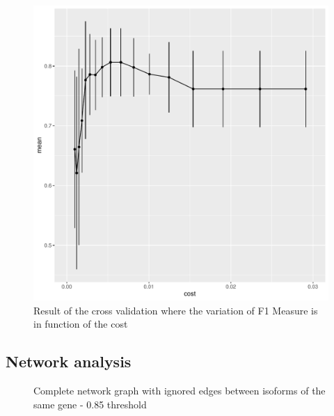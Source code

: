 \documentclass[journal]{IEEEtran}
\begin{document}
\begin{figure}[!ht]
    \centering
    \includegraphics[width=.8\linewidth]{images/svm_metrics.pdf}
    \caption{Result of the cross validation where the variation of F1 Measure is in function of the cost}\label{fig:svm}
\end{figure}


\clearpage
\newpage
\subsection{Network analysis}

\begin{figure}[!ht]
    \centering
    \caption{Complete network graph with ignored edges between isoforms of the same gene - 0.85 threshold}\label{fig:comp_graph_ignored}
\end{figure}
\end{document}
